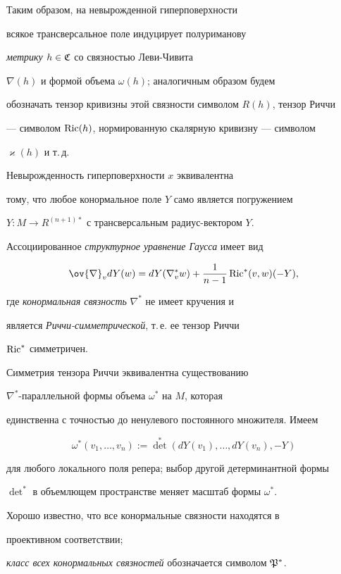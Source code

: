 Таким образом, на невырожденной гиперповерхности


всякое трансверсальное поле индуцирует полуриманову


{\it метрику} $h \in \frak C$ со связностью Леви-Чивита


$\nabla (h)$ и формой объема $\omega (h)$; аналогичным образом будем


обозначать тензор кривизны этой связности символом $R(h)$, тензор Риччи


--- символом $\operatorname{Ric}(h)$, нормированную скалярную кривизну --- символом


$\varkappa (h)$ и т.\,д.





Невырожденность гиперповерхности $x$ эквивалентна


тому, что любое конормальное поле $Y$ само является погружением


$Y: M \to R^{(n+1)*}$ с трансверсальным радиус-вектором $Y$.


Ассоциированное {\it структурное уравнение Гаусса} имеет вид


$$


\ov{\nabla} _v dY(w) = dY(\nabla^*_v w) + \frac{1}{n-1}


\Ric^* (v,w)(-Y),


$$


где {\it конормальная связность} $\nabla^*$ не имеет кручения и


является {\it Риччи-симметрической}, т.\,е. ее тензор Риччи


$\operatorname{Ric}^*$ симметричен.


Симметрия тензора Риччи эквивалентна существованию


$ \nabla^*$-параллельной формы объема $ \omega ^*$ на $M$, которая


единственна с точностью до ненулевого постоянного множителя. Имеем


$$


\omega ^* (v_1, \dotsc, v_n) := \det^* (dY(v_1), \dotsc, dY(v_n), -Y)


$$


для любого локального поля репера; выбор другой детерминантной формы


$\det^*$ в объемлющем пространстве меняет масштаб формы $\omega^*$.


Хорошо известно, что все конормальные связности находятся в


проективном соответствии;


{\it класс всех конормальных связностей} обозначается символом $\frak P^*$.






